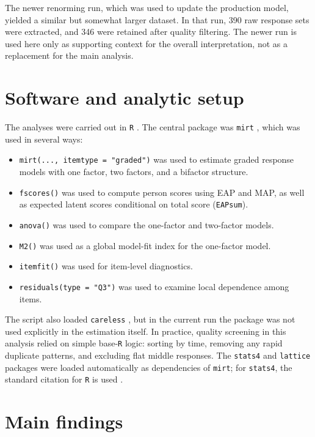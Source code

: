 \documentclass[11pt,a4paper]{article}
\begin{document}
The newer renorming run, which was used to update the production model, yielded a similar but somewhat larger dataset. In that run, 390 raw response sets were extracted, and 346 were retained after quality filtering. The newer run is used here only as supporting context for the overall interpretation, not as a replacement for the main analysis.

\section{Software and analytic setup}
The analyses were carried out in \texttt{R} \parencite{RCore2026}. The central package was \texttt{mirt} \parencite{Chalmers2012mirt}, which was used in several ways:

\begin{itemize}
\item \texttt{mirt(..., itemtype = "graded")} was used to estimate graded response models with one factor, two factors, and a bifactor structure.
\item \texttt{fscores()} was used to compute person scores using EAP and MAP, as well as expected latent scores conditional on total score (\texttt{EAPsum}).
\item \texttt{anova()} was used to compare the one-factor and two-factor models.
\item \texttt{M2()} was used as a global model-fit index for the one-factor model.
\item \texttt{itemfit()} was used for item-level diagnostics.
\item \texttt{residuals(type = "Q3")} was used to examine local dependence among items.
\end{itemize}

The script also loaded \texttt{careless} \parencite{YentesWilhelm2023careless}, but in the current run the package was not used explicitly in the estimation itself. In practice, quality screening in this analysis relied on simple base-\texttt{R} logic: sorting by time, removing any rapid duplicate patterns, and excluding flat middle responses. The \texttt{stats4} and \texttt{lattice} packages \parencite{Sarkar2008lattice} were loaded automatically as dependencies of \texttt{mirt}; for \texttt{stats4}, the standard citation for \texttt{R} is used \parencite{RCore2026}.

\section{Main findings}
\end{document}
